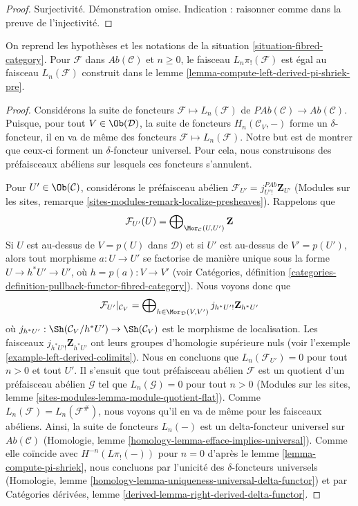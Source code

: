 \begin{proof}
\medskip\noindent
Surjectivité. Démonstration omise. Indication : raisonner comme dans la preuve de
l'injectivité.
\end{proof}

\begin{lemma}
\label{lemma-compute-left-derived-pi-shriek}
On reprend les hypothèses et les notations de la situation \ref{situation-fibred-category}.
Pour $\mathcal{F}$ dans $\textit{Ab}(\mathcal{C})$ et $n \geq 0$,
le faisceau $L_n\pi_!(\mathcal{F})$ est égal au faisceau
$L_n(\mathcal{F})$ construit dans le
lemme \ref{lemma-compute-left-derived-pi-shriek-pre}.
\end{lemma}

\begin{proof}
Considérons la suite de foncteurs $\mathcal{F} \mapsto L_n(\mathcal{F})$
de $\textit{PAb}(\mathcal{C}) \to \textit{Ab}(\mathcal{C})$.
Puisque, pour tout $V \in \Ob(\mathcal{D})$, la suite de foncteurs
$H_n(\mathcal{C}_V, - )$ forme un $\delta$-foncteur,
il en va de même des foncteurs $\mathcal{F} \mapsto L_n(\mathcal{F})$.
Notre but est de montrer que ceux-ci forment un $\delta$-foncteur universel.
Pour cela, nous construisons des préfaisceaux abéliens
sur lesquels ces foncteurs s'annulent.

\medskip\noindent
Pour $U' \in \Ob(\mathcal{C})$, considérons le préfaisceau abélien
$\mathcal{F}_{U'} = j_{U'!}^{\textit{PAb}}\mathbf{Z}_{U'}$
(Modules sur les sites, remarque \ref{sites-modules-remark-localize-presheaves}).
Rappelons que
$$
\mathcal{F}_{U'}(U) =
\bigoplus\nolimits_{\Mor_\mathcal{C}(U, U')} \mathbf{Z}
$$
Si $U$ est au-dessus de $V = p(U)$ dans $\mathcal{D})$ et si $U'$ est au-dessus de $V' = p(U')$,
alors tout morphisme $a : U \to U'$ se factorise de manière unique sous la forme $U \to h^*U' \to U'$,
où $h = p(a) : V \to V'$ (voir
Catégories, définition
\ref{categories-definition-pullback-functor-fibred-category}).
Nous voyons donc que
$$
\mathcal{F}_{U'}|_{\mathcal{C}_V}
=
\bigoplus\nolimits_{h \in \Mor_\mathcal{D}(V, V')}
j_{h^*U'!}\mathbf{Z}_{h^*U'}
$$
où $j_{h^*U'} : \Sh(\mathcal{C}_V/h^*U') \to \Sh(\mathcal{C}_V)$
est le morphisme de localisation. Les faisceaux $j_{h^*U'!}\mathbf{Z}_{h^*U'}$
ont leurs groupes d'homologie supérieure nuls (voir
l'exemple \ref{example-left-derived-colimits}).
Nous en concluons que $L_n(\mathcal{F}_{U'}) = 0$ pour tout $n > 0$ et tout $U'$.
Il s'ensuit que tout préfaisceau abélien $\mathcal{F}$ est un quotient
d'un préfaisceau abélien $\mathcal{G}$ tel que $L_n(\mathcal{G}) = 0$ pour
tout $n > 0$ (Modules sur les sites, lemme
\ref{sites-modules-lemma-module-quotient-flat}).
Comme $L_n(\mathcal{F}) = L_n(\mathcal{F}^\#)$, nous voyons
qu'il en va de même pour les faisceaux abéliens. Ainsi,
la suite de foncteurs $L_n(-)$ est un delta-foncteur universel
sur $\textit{Ab}(\mathcal{C})$
(Homologie, lemme \ref{homology-lemma-efface-implies-universal}).
Comme elle coïncide avec
$H^{-n}(L\pi_!(-))$ pour $n = 0$ d'après le
lemme \ref{lemma-compute-pi-shriek},
nous concluons par l'unicité des $\delta$-foncteurs universels
(Homologie, lemme \ref{homology-lemma-uniqueness-universal-delta-functor})
et par
Catégories dérivées, lemme \ref{derived-lemma-right-derived-delta-functor}.
\end{proof}

